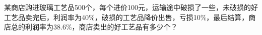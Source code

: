 某商店购进玻璃工艺品500个，每个进价100元，运输途中破损了一些，未破损的好工艺品卖完后，利润率为40$\%$，破损的工艺品降价出售，亏损10$\%$，最后结算，商店总的利润率为38.6$\%$，商店卖出的好工艺品有多少个？



